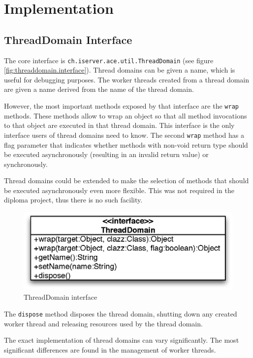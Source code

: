 \section{Implementation}

\subsection{ThreadDomain Interface}
The core interface is \texttt{ch.iserver.ace.util.ThreadDomain} 
(see figure \ref{fig:threaddomain.interface}). Thread domains can be given
a name, which is useful for debugging purposes. The worker threads created
from a thread domain are given a name derived from the name of the thread
domain.

However, the most important methods exposed by that interface are the 
\texttt{wrap} methods. These methods allow to wrap an object so that all 
method invocations to that object are executed in that thread domain. This 
interface is the only interface users of thread domains need to know. The
second \texttt{wrap} method has a flag parameter that indicates whether
methods with non-void return type should be executed asynchronously (resulting
in an invalid return value) or synchronously.

Thread domains could be extended to make the selection of methods that should
be executed asynchronously even more flexible. This was not required in
the diploma project, thus there is no such facility.

\begin{figure}[H]
 \centering
 \includegraphics[width=11.4cm,height=4.2cm]{../images/finalreport/threaddomain_uml.eps}
 \caption{ThreadDomain interface}
 \label{fig:threaddomain_interface}
\end{figure}

The \texttt{dispose} method disposes the thread domain, shutting down 
any created worker thread and releasing resources used by the thread domain.

The exact implementation of thread domains can vary significantly. The most 
significant differences are found in the management of worker threads.


